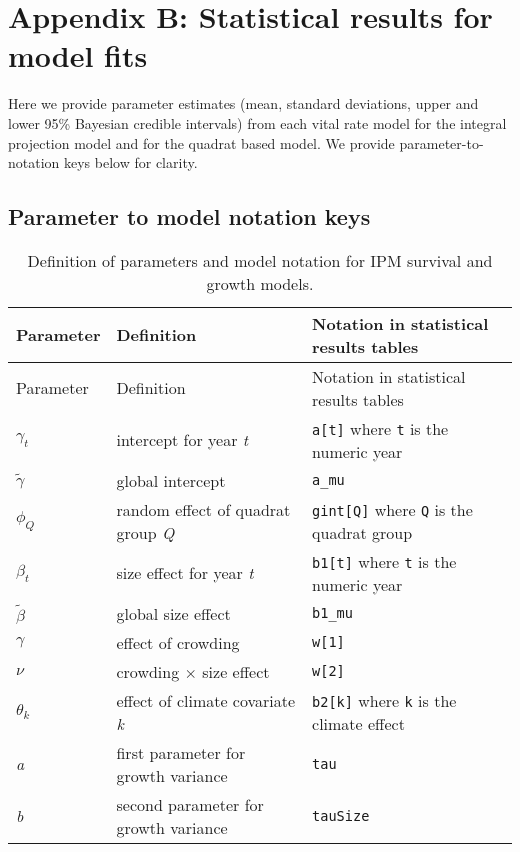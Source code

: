 \documentclass[12pt,]{article}
\title{}
\author{}
\date{}
\begin{document}
\maketitle


\section{Appendix B: Statistical results for model
fits}\label{appendix-b-statistical-results-for-model-fits}

Here we provide parameter estimates (mean, standard deviations, upper
and lower 95\% Bayesian credible intervals) from each vital rate model
for the integral projection model and for the quadrat based model. We
provide parameter-to-notation keys below for clarity.

\subsection{Parameter to model notation
keys}\label{parameter-to-model-notation-keys}

\begin{longtable}[c]{@{}lll@{}}
\caption{Definition of parameters and model notation for IPM survival
and growth models.}\tabularnewline
\toprule
Parameter & Definition & Notation in statistical results
tables\tabularnewline
\midrule
\endfirsthead
\toprule
Parameter & Definition & Notation in statistical results
tables\tabularnewline
\midrule
\endhead
\(\gamma_{t}\) & intercept for year \emph{t} & \texttt{a{[}t{]}} where
\texttt{t} is the numeric year\tabularnewline
\(\tilde{\gamma}\) & global intercept & \texttt{a\_mu}\tabularnewline
\(\phi_{Q}\) & random effect of quadrat group \emph{Q} &
\texttt{gint{[}Q{]}} where \texttt{Q} is the quadrat
group\tabularnewline
\(\beta_{t}\) & size effect for year \emph{t} & \texttt{b1{[}t{]}} where
\texttt{t} is the numeric year\tabularnewline
\(\tilde{\beta}\) & global size effect & \texttt{b1\_mu}\tabularnewline
\(\gamma\) & effect of crowding & \texttt{w{[}1{]}}\tabularnewline
\(\nu\) & crowding \(\times\) size effect &
\texttt{w{[}2{]}}\tabularnewline
\(\theta_{k}\) & effect of climate covariate \emph{k} &
\texttt{b2{[}k{]}} where \texttt{k} is the climate effect\tabularnewline
\emph{a} & first parameter for growth variance &
\texttt{tau}\tabularnewline
\emph{b} & second parameter for growth variance &
\texttt{tauSize}\tabularnewline
\bottomrule
\end{longtable}
\end{document}
